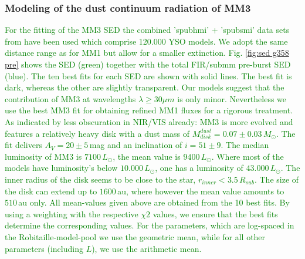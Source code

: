 \documentclass[longauth,usenatbib]{aa}
\begin{document}
\subsubsection{Modeling of the dust continuum radiation of MM3}\label{drt3}
\textcolor{green}{For the fitting of the MM3 SED the combined 'spubhmi' + 'spubsmi' data sets from  have been used which comprise 120.000 YSO models. We adopt the same distance range as for MM1 but allow for a smaller extinction.}
\textcolor{green}{Fig. \ref{fig:sed g358 pre} shows the SED (green) together with the total FIR/submm pre-burst SED (blue). The ten best fits for each SED are shown with solid lines. The best fit is dark, whereas the other are slightly transparent. 
Our models suggest that the contribution of MM3 at wavelengths $\lambda \ge 30 \mu m$ is only minor. Nevertheless we use the best MM3 fit for obtaining refined MM1 fluxes for a rigorous treatment. 
}
\textcolor{green}{As indicated by less obscuration in NIR/VIS already: MM3 is more evolved and features a relatively heavy disk with a dust mass of $M_{disk}^{dust}{=}0.07 \pm 0.03\,M_\odot$.}
\textcolor{green}{ The fit delivers $A_V{=}20\pm 5\,$mag and an inclination of $i{=}51 \pm 9$\degr. The median luminosity of MM3 is $7100\,L_\odot$, the mean value is $9400\,L_\odot$. Where most of the models have luminosity's below $10.000\,L_\odot$, one has a luminosity of $43.000\,L_\odot$. 
The inner radius of the disk seems to be close to the star, $r_{inner}{<}3.5\,R_{sub}$. The size of the disk can extend up to $1600\,$au, where however the mean value amounts to $510\,$au only.
All mean-values given above are obtained from the 10 best fits. By using a weighting with the respective $\chi 2$ values, we ensure that the best fits determine the corresponding values. For the parameters, which are log-spaced in the Robitaille-model-pool we use the geometric mean, while for all other parameters (including $L$), we use the arithmetic mean.}
\end{document}
